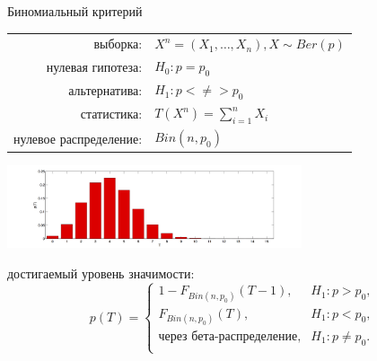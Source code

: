 \documentclass[9pt,pdf,utf8,hyperref={unicode},aspectratio=169]{beamer}
\begin{document}
\begin{frame}{Биномиальный критерий}
	\begin{center}
		\begin{tabular}{rl}
			выборка:                        & $X^{n}=\left(X_{1},\ldots,X_{n}\right), X \sim Ber\left(p\right)$ \\
			нулевая гипотеза:               & $H_0\colon p=p_0$ \\
			альтернатива:                   & $H_1\colon p<\neq>p_0$ \\
			статистика:                     & $T\left(X^{n}\right) = \sum\limits_{i=1}^n X_i$ \\
			нулевое распределение:          & $Bin(n,p_0)$\\
		\end{tabular}
		\includegraphics[width=0.65\textwidth]{bin_nonsym.png}
	\end{center}
	
	\vspace{-5pt}
	достигаемый уровень значимости:
	$$p\left(T\right) = \begin{cases}
	1-F_{Bin(n,p_0)}(T-1), & H_1 \colon p>p_0, \\
	F_{Bin(n,p_0)}(T),   & H_1 \colon p<p_0, \\
	\text{через бета-распределение},       & H_1 \colon p\neq p_0. \\
	\end{cases}
	$$
	
\end{frame}
\end{document}
